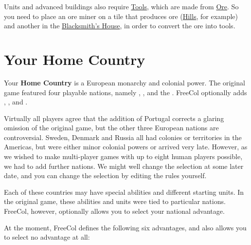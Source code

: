 \documentclass[12pt]{book}
\begin{document}
Units and advanced buildings also require \hyperlink{Tools}{Tools},
which are made from \hyperlink{Ore}{Ore}. So you need to place an ore
miner on a tile that produces ore (\hyperlink{Hills}{Hills}, for
example) and another in the \hyperlink{Blacksmith's
House}{Blacksmith's House}, in order to convert the ore into tools.



\hypertarget{Home Country}{\chapter{Your Home Country}}

Your \textbf{Home Country} is a European monarchy and colonial
power. The original game featured four playable nations, namely
, ,  and the
. FreeCol optionally adds
, ,  and
.

Virtually all players agree that the addition of Portugal corrects a
glaring omission of the original game, but the other three European
nations are controversial. Sweden, Denmark and Russia all had colonies
or territories in the Americas, but were either minor colonial powers
or arrived very late. However, as we wished to make multi-player games
with up to eight human players possible, we had to add further
nations. We might well change the selection at some later date, and
you can change the selection by editing the rules yourself.

Each of these countries may have special abilities and different
starting units. In the original game, these abilities and units were
tied to particular nations. FreeCol, however, optionally allows you to
select your national advantage.

At the moment, FreeCol defines the following six advantages, and also
allows you to select no advantage at all:
\end{document}
